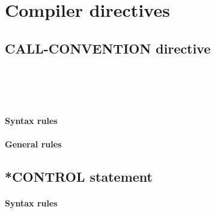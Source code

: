 \chapter{Compiler directives}

\section{CALL-CONVENTION directive}

\begin{syntax}
  \directiveindicator{}
  \begin{1=}
     \\
     \\
     \\
  \end{1=}
\end{syntax}

\subsubsection{Syntax rules}

\subsubsection{General rules}

\section{*CONTROL statement}

\begin{syntax}[\miscextcolour]
\end{syntax}

\subsubsection{Syntax rules}

